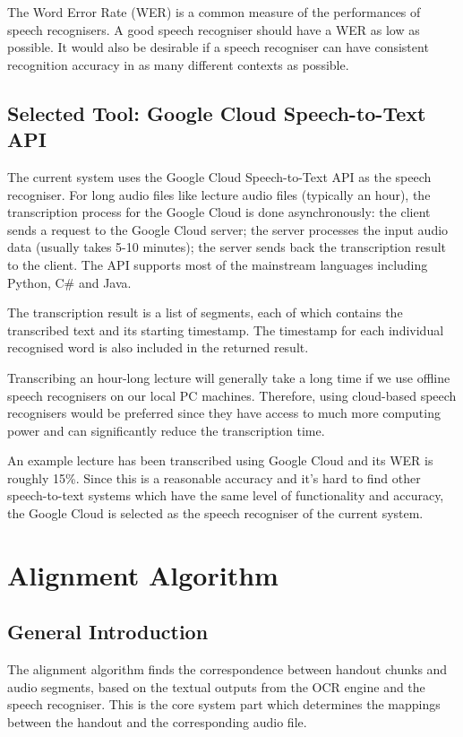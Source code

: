 The Word Error Rate (WER) is a common measure of the performances of speech recognisers. A good speech recogniser should have a WER as low as possible. It would also be desirable if a speech recogniser can have consistent recognition accuracy in as many different contexts as possible.

\subsection{Selected Tool: Google Cloud Speech-to-Text API}

The current system uses the Google Cloud Speech-to-Text API as the speech recogniser. For long audio files like lecture audio files (typically an hour), the transcription process for the Google Cloud is done asynchronously: the client sends a request to the Google Cloud server; the server processes the input audio data (usually takes 5-10 minutes); the server sends back the transcription result to the client. The API supports most of the mainstream languages including Python, C\# and Java.

The transcription result is a list of segments, each of which contains the transcribed text and its starting timestamp. The timestamp for each individual recognised word is also included in the returned result.

Transcribing an hour-long lecture will generally take a long time if we use offline speech recognisers on our local PC machines. Therefore, using cloud-based speech recognisers would be preferred since they have access to much more computing power and can significantly reduce the transcription time. 

An example lecture has been transcribed using Google Cloud and its WER is roughly 15\%. Since this is a reasonable accuracy and it's hard to find other speech-to-text systems which have the same level of functionality and accuracy, the Google Cloud is selected as the speech recogniser of the current system.


\section{Alignment Algorithm}

\subsection{General Introduction}

The alignment algorithm finds the correspondence between handout chunks and audio segments, based on the textual outputs from the OCR engine and the speech recogniser. This is the core system part which determines the mappings between the handout and the corresponding audio file. 

